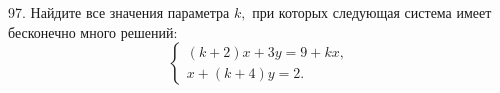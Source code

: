 97. Найдите все значения параметра $k,$ при которых следующая система имеет бесконечно много решений:
$$\begin{cases}
(k+2)x+3y=9+kx,\\
x+(k+4)y=2.
\end{cases}$$\\
